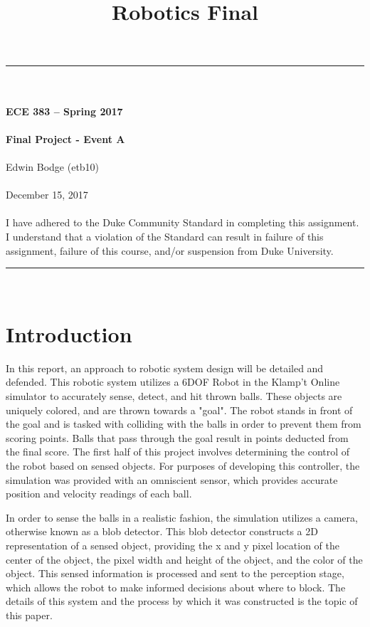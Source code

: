 \documentclass{article}
\title{Robotics Final}
\begin{document}
\begin{center}
\rule{6.5in}{0.5mm}\\~\\
{\bf \large ECE 383 -- Spring 2017}\\~\\
{\huge \bf Final Project - Event A}\\~\\ 
Edwin Bodge (etb10)\\~\\
December 15, 2017\\~\\
{\small I have adhered to the Duke Community Standard in completing this assignment.  I understand that a violation of the Standard can result in failure of this assignment, failure of this course, and/or suspension from Duke University.} 
\rule{6.5in}{0.5mm}\\
\end{center}
\tableofcontents
\listoffigures
\pagebreak

\section{Introduction}
In this report, an approach to robotic system design will be detailed and defended. This robotic system utilizes a 6DOF Robot in the Klamp't Online simulator to accurately sense, detect, and hit thrown balls. These objects are uniquely colored, and are thrown towards a "goal". The robot stands in front of the goal and is tasked with colliding with the balls in order to prevent them from scoring points. Balls that pass through the goal result in points deducted from the final score. The first half of this project involves determining the control of the robot based on sensed objects. For purposes of developing this controller, the simulation was provided with an omniscient sensor, which provides accurate position and velocity readings of each ball. \par

In order to sense the balls in a realistic fashion, the simulation utilizes a camera, otherwise known as a blob detector. This blob detector constructs a 2D representation of a sensed object, providing the x and y pixel location of the center of the object, the pixel width and height of the object, and the color of the object. This sensed information is processed and sent to the perception stage, which allows the robot to make informed decisions about where to block. The details of this system and the process by which it was constructed is the topic of this paper.
\end{document}
